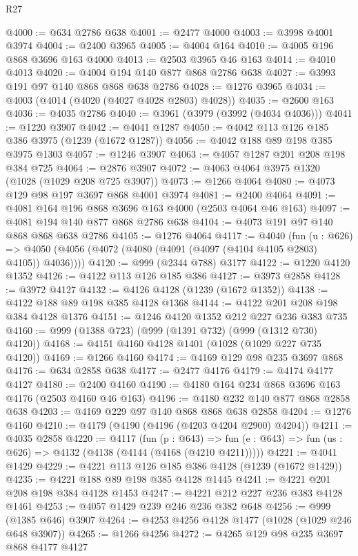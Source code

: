\begin{lexlean}{R27}
\begin{coremodule}
@4000 := @634 @2786 @638
@4001 := @2477 @4000
@4003 := @3998 @4001 @3974
@4004 := @2400 @3965
@4005 := @4004 @164
@4010 := @4005 @196 @868 @3696 @163 @4000
@4013 := @2503 @3965 @46 @163
@4014 := @4010 @4013
@4020 := @4004 @194 @140 @877 @868 @2786 @638
@4027 := @3993 @191 @97 @140 @868 @868 @638 @2786
@4028 := @1276 @3965
@4034 := @4003 (@4014 (@4020 (@4027 @4028 @2803) @4028))
@4035 := @2600 @163
@4036 := @4035 @2786
@4040 := @3961 (@3979 (@3992 (@4034 @4036)))
@4041 := @1220 @3907
@4042 := @4041 @1287
@4050 := @4042 @113 @126 @185 @386 @3975 (@1239 (@1672 @1287))
@4056 := @4042 @188 @89 @198 @385 @3975 @1303
@4057 := @1246 @3907
@4063 := @4057 @1287 @201 @208 @198 @384 @725
@4064 := @2876 @3907
@4072 := @4063 @4064 @3975 @1320 (@1028 (@1029 @208 @725 @3907))
@4073 := @1266 @4064
@4080 := @4073 @129 @98 @197 @3697 @868 @4001 @3974
@4081 := @2400 @4064
@4091 := @4081 @164 @196 @868 @3696 @163 @4000 (@2503 @4064 @46 @163)
@4097 := @4081 @194 @140 @877 @868 @2786 @638
@4104 := @4073 @191 @97 @140 @868 @868 @638 @2786
@4105 := @1276 @4064
@4117 := @4040
    (fun (u : @626) =>
    @4050 (@4056 (@4072 (@4080 (@4091 (@4097 (@4104 @4105 @2803) @4105)) @4036))))
@4120 := @999 (@2344 @788) @3177
@4122 := @1220 @4120 @1352
@4126 := @4122 @113 @126 @185 @386
@4127 := @3973 @2858
@4128 := @3972 @4127
@4132 := @4126 @4128 (@1239 (@1672 @1352))
@4138 := @4122 @188 @89 @198 @385 @4128 @1368
@4144 := @4122 @201 @208 @198 @384 @4128 @1376
@4151 := @1246 @4120 @1352 @212 @227 @236 @383 @735
@4160 := @999 (@1388 @723) (@999 (@1391 @732) (@999 (@1312 @730) @4120))
@4168 := @4151 @4160 @4128 @1401 (@1028 (@1029 @227 @735 @4120))
@4169 := @1266 @4160
@4174 := @4169 @129 @98 @235 @3697 @868
@4176 := @634 @2858 @638
@4177 := @2477 @4176
@4179 := @4174 @4177 @4127
@4180 := @2400 @4160
@4190 := @4180 @164 @234 @868 @3696 @163 @4176 (@2503 @4160 @46 @163)
@4196 := @4180 @232 @140 @877 @868 @2858 @638
@4203 := @4169 @229 @97 @140 @868 @868 @638 @2858
@4204 := @1276 @4160
@4210 := @4179 (@4190 (@4196 (@4203 @4204 @2900) @4204))
@4211 := @4035 @2858
@4220 := @4117
    (fun (p : @643) =>
    fun (e : @643) => fun (us : @626) => @4132 (@4138 (@4144 (@4168 (@4210 @4211)))))
@4221 := @4041 @1429
@4229 := @4221 @113 @126 @185 @386 @4128 (@1239 (@1672 @1429))
@4235 := @4221 @188 @89 @198 @385 @4128 @1445
@4241 := @4221 @201 @208 @198 @384 @4128 @1453
@4247 := @4221 @212 @227 @236 @383 @4128 @1461
@4253 := @4057 @1429 @239 @246 @236 @382 @648
@4256 := @999 (@1385 @646) @3907
@4264 := @4253 @4256 @4128 @1477 (@1028 (@1029 @246 @648 @3907))
@4265 := @1266 @4256
@4272 := @4265 @129 @98 @235 @3697 @868 @4177 @4127

\end{coremodule}
\end{lexlean}
